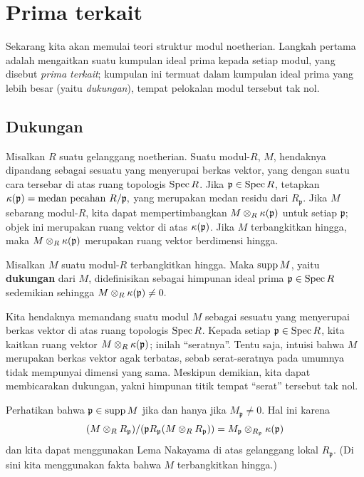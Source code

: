\section{Prima terkait}

Sekarang kita akan memulai teori struktur modul noetherian. Langkah pertama
adalah mengaitkan suatu kumpulan ideal prima kepada setiap modul, yang disebut
\emph{prima terkait}; kumpulan ini termuat dalam kumpulan ideal prima yang lebih besar (yaitu
\emph{dukungan}), tempat
pelokalan modul tersebut tak nol.

\subsection{Dukungan}
 Misalkan $R$ suatu gelanggang noetherian. Suatu modul-$R$, $M$, hendaknya dipandang
 sebagai sesuatu yang menyerupai berkas vektor, yang dengan suatu cara
tersebar di atas ruang topologis $\operatorname{Spec} R$. Jika $\mathfrak{p} \in \operatorname{Spec} R$, tetapkan
\( \kappa(\mathfrak{p}) = \mathrm{medan \ pecahan \ } R/\mathfrak{p}  ,\)
yang merupakan medan residu dari $R_{\mathfrak{p}}$. Jika $M$ sebarang modul-$R$, kita
dapat mempertimbangkan $M \otimes_R \kappa(\mathfrak{p})$ untuk setiap $\mathfrak{p}$; objek ini merupakan
ruang vektor di atas $\kappa(\mathfrak{p})$. Jika $M$ terbangkitkan hingga, maka $M \otimes_R
\kappa(\mathfrak{p})$ merupakan ruang vektor berdimensi hingga.

\begin{definition} 
Misalkan $M$ suatu modul-$R$ terbangkitkan hingga. Maka $\operatorname{supp} M$, yaitu
\textbf{dukungan} dari $M$, didefinisikan sebagai himpunan ideal prima
$\mathfrak{p} \in \operatorname{Spec} R$ sedemikian sehingga
\( M \otimes_R \kappa(\mathfrak{p}) \neq 0.  \)
\end{definition} 

Kita hendaknya memandang suatu modul $M$ sebagai sesuatu yang menyerupai berkas vektor
di atas ruang topologis
$\operatorname{Spec} R$. Kepada setiap $\mathfrak{p} \in \operatorname{Spec} R$, kita kaitkan ruang vektor $M
\otimes_R \kappa(\mathfrak{p})$; inilah “seratnya”. Tentu saja, intuisi bahwa
$M$ merupakan berkas vektor agak terbatas, sebab serat-seratnya
pada umumnya tidak mempunyai dimensi yang sama.
Meskipun demikian, kita dapat membicarakan dukungan, yakni himpunan titik tempat
“serat” tersebut tak nol.

Perhatikan bahwa $\mathfrak{p} \in \operatorname{supp} M$ jika dan hanya jika $M_{\mathfrak{p}} \neq 0$. Hal ini
karena
\[ (M \otimes_R R_{\mathfrak{p}})/( \mathfrak{p} R_{\mathfrak{p}} (M \otimes_R
R_{\mathfrak{p}}))  = M_{\mathfrak{p}}
\otimes_{R_{\mathfrak{p}}} \kappa(\mathfrak{p})  \]
dan kita dapat menggunakan Lema Nakayama di atas gelanggang lokal $R_{\mathfrak{p}}$. (Di sini kita
menggunakan fakta bahwa $M$ terbangkitkan hingga.)

